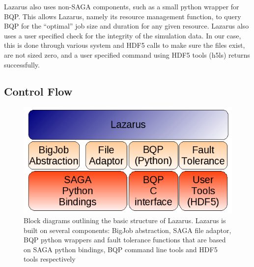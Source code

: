 \documentclass[conference,final]{IEEEtran}
\begin{document}
Lazarus also uses non-SAGA components, such as a small python wrapper
for BQP. This allows Lazarus, namely its resource management function, to query
BQP for the ``optimal'' job size and duration for any given resource. Lazarus
also uses a user specified check for the integrity of the simulation data. In our
case, this is done through various system and HDF5 calls to make sure the files exist,
are not sized zero, and a user specified command using HDF5 tools (h5ls) returns successfully.



\subsection{Control Flow}

\begin{figure}
\begin{center}
\includegraphics[scale=0.5]{./figures/Architecture.png}
\caption{Block diagrams outlining the basic structure of Lazarus. Lazarus is built on
several components: BigJob abstraction, SAGA file adaptor, BQP python wrappers and fault tolerance
functions that are based on SAGA python bindings, BQP command line tools and HDF5 tools respectively
}
\end{center}

\label{fig:application_architecture}
\end{figure}
\end{document}
